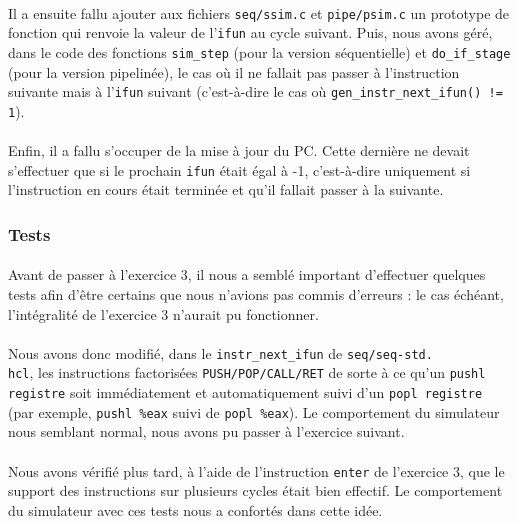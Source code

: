 \documentclass[12pt]{article}
\begin{document}
\paragraph{}Il a ensuite fallu ajouter aux fichiers \verb+seq/ssim.c+ et \verb+pipe/psim.c+ un prototype de fonction qui renvoie la valeur de l'\verb+ifun+ au cycle suivant. Puis, nous avons géré, dans le code des fonctions \verb+sim_step+ (pour la version séquentielle) et \verb+do_if_stage+ (pour la version pipelinée), le cas où il ne fallait pas passer à l'instruction suivante mais à l'\verb+ifun+ suivant (c'est-à-dire le cas où \verb+gen_instr_next_ifun() != 1+).

\paragraph{}Enfin, il a fallu s'occuper de la mise à jour du PC. Cette dernière ne devait s'effectuer que si le prochain \verb+ifun+ était égal à -1, c'est-à-dire uniquement si l'instruction en cours était terminée et qu'il fallait passer à la suivante. 


\subsubsection{Tests}
\paragraph{}Avant de passer à l'exercice 3, il nous a semblé important d'effectuer quelques tests afin d'être certains que nous n'avions pas commis d'erreurs : le cas échéant, l'intégralité de l'exercice 3 n'aurait pu fonctionner.

\paragraph{}Nous avons donc modifié, dans le \verb+instr_next_ifun+ de \verb+seq/seq-std.+\\\verb+hcl+, les instructions factorisées \verb+PUSH/POP/CALL/RET+ de sorte à ce qu'un \verb+pushl registre+ soit immédiatement et automatiquement suivi d'un \verb+popl registre+ (par exemple, \verb+pushl %eax+ suivi de \verb+popl %eax+). Le comportement du simulateur nous semblant normal, nous avons pu passer à l'exercice suivant.

\paragraph{}Nous avons vérifié plus tard, à l'aide de l'instruction \verb+enter+ de l'exercice 3, que le support des instructions sur plusieurs cycles était bien effectif. Le comportement du simulateur avec ces tests nous a confortés dans cette idée.
\end{document}
